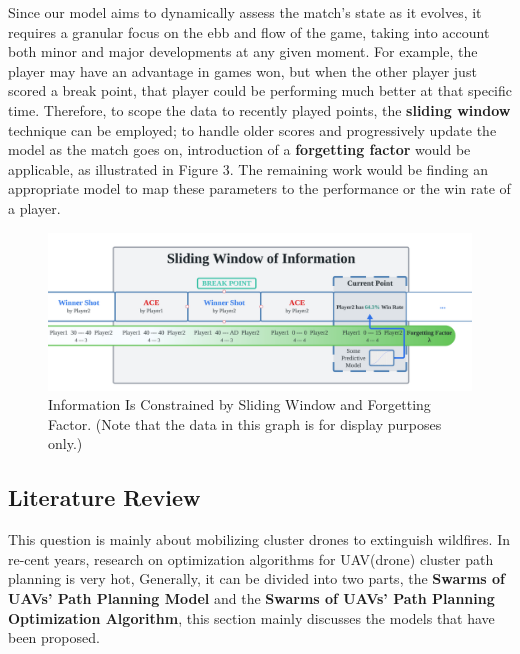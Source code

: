 \documentclass[12pt]{article}  %
\begin{document}
Since our model aims to dynamically assess the match's state as it evolves, it requires a granular focus on the ebb and flow of the game, taking into account both minor and major developments at any given moment. For example, the player may have an advantage in games won, but when the other player just scored a break point, that player could be performing much better at that specific time. Therefore, to scope the data to recently played points, the \textbf{sliding window} technique can be employed; to handle older scores and progressively update the model as the match goes on, introduction of a \textbf{forgetting factor} would be applicable, as illustrated in Figure 3. The remaining work would be finding an appropriate model to map these parameters to the performance or the win rate of a player. 

\begin{figure}[htbp]  %
	\centering  %
	\includegraphics[width=.85\textwidth]{sliding-window.png} %
	\caption{\centering Information Is Constrained by Sliding Window and Forgetting Factor. (Note that the data in this graph is for display purposes only.)} %
\end{figure}


\subsection{Literature Review}
This question is mainly about mobilizing cluster drones to extinguish wildfires. In re-cent years, research on optimization algorithms for UAV(drone) cluster path planning is very hot, Generally, it can be divided into two parts, the \textbf{Swarms of UAVs' Path Planning Model} and the \textbf{Swarms of UAVs' Path Planning Optimization Algorithm}, this section mainly discusses the models that have been proposed.
\end{document}
